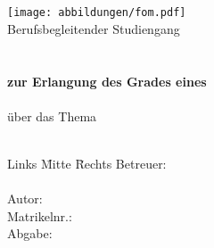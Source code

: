 \documentclass[12pt,oneside,titlepage,listof=totoc,bibliography=totoc]{scrartcl}
\begin{document}
\renewcommand{\refname}{Literaturverzeichnis}		%

\begin{titlepage}
	\begin{center}
		\textbf{\myHochschulName}\\
		\textbf{\myHochschulStandort}\\
		\vspace{1.5cm}
			\texttt{[image: abbildungen/fom.pdf]} \\
		\vspace{1.5cm}
		Berufsbegleitender Studiengang\\
		\myStudiengang \\ %
		\vspace{2cm}
		\textbf{\myThesisArt}\\
		\textbf{zur Erlangung des Grades eines}\\
		\textbf{\myAkademischerGrad}\\
		\vspace{2cm}
		über das Thema\\
		\Huge{\myTitel}\\
		\vspace{0.2cm}
	\end{center}
	\normalsize
	\vfill
	\begin{tabbing}
		Links \= Mitte \= Rechts\kill
		Betreuer: \> \> \myBetreuer\\
		\> \> \\

		Autor: \> \> \myAutor\\
		\> \>  Matrikelnr.: \myMatrikelNr\\
		Abgabe: \> \> %
	\end{tabbing}
\end{titlepage}

\end{document}
